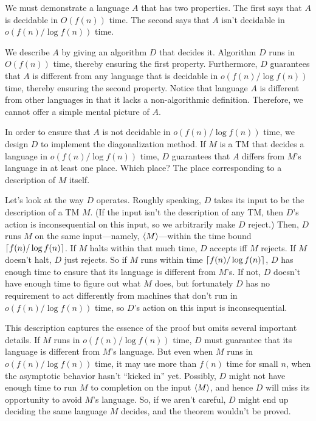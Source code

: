 \begin{proofidea}
  We must demonstrate a language $A$ that has two properties. The first says that $A$ is decidable in $O(f(n))$ time. The second says that $A$ isn't decidable in $o(f(n) / \log f(n))$ time.

  We describe $A$ by giving an algorithm $D$ that decides it. Algorithm $D$ runs in $O(f(n))$ time, thereby ensuring the first property. Furthermore, $D$ guarantees that $A$ is different from any language that is decidable in $o(f(n) / \log f(n))$ time, thereby ensuring the second property. Notice that language $A$ is different from other languages in that it lacks a non-algorithmic definition. Therefore, we cannot offer a simple mental picture of $A$.

  In order to ensure that $A$ is not decidable in $o(f(n) / \log f(n))$ time, we design $D$ to implement the diagonalization method. If $M$ is a TM that decides a language in $o(f(n) / \log f(n))$ time, $D$ guarantees that $A$ differs from $M$'s language in at least one place. Which place? The place corresponding to a description of $M$ itself.

  Let's look at the way $D$ operates. Roughly speaking, $D$ takes its input to be the description of a TM $M$. (If the input isn't the description of any TM, then $D$'s action is inconsequential on this input, so we arbitrarily make $D$ reject.) Then, $D$ runs $M$ on the same input—namely, $\left< M \right>$—within the time bound $\lceil f(n) / \log f(n) \rceil$. If $M$ halts within that much time, $D$ accepts iff $M$ rejects. If $M$ doesn't halt, $D$ just rejects. So if $M$ runs within time $\lceil f(n) / \log f(n) \rceil$, $D$ has enough time to ensure that its language is different from $M$'s. If not, $D$ doesn't have enough time to figure out what $M$ does, but fortunately $D$ has no requirement to act differently from machines that don't run in $o(f(n) / \log f(n))$ time, so $D$'s action on this input is inconsequential.

  This description captures the essence of the proof but omits several important details. If $M$ runs in $o(f(n) / \log f(n))$ time, $D$ must guarantee that its language is different from $M$'s language. But even when $M$ runs in $o(f(n) / \log f(n))$ time, it may use more than $f(n)$ time for small $n$, when the asymptotic behavior hasn't ``kicked in'' yet. Possibly, $D$ might not have enough time to run $M$ to completion on the input $\left< M \right>$, and hence $D$ will miss its opportunity to avoid $M$'s language. So, if we aren't careful, $D$ might end up deciding the same language $M$ decides, and the theorem wouldn't be proved.


\end{proofidea}
